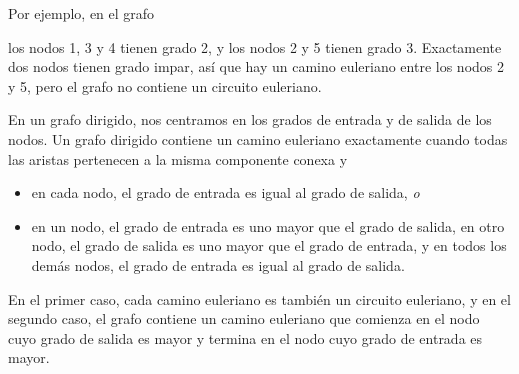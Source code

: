 \begin{samepage}
Por ejemplo, en el grafo
\begin{center}
\end{center}
\end{samepage}
los nodos 1, 3 y 4 tienen grado 2,
y los nodos 2 y 5 tienen grado 3.
Exactamente dos nodos tienen grado impar,
así que hay un camino euleriano entre los nodos 2 y 5,
pero el grafo no contiene un circuito euleriano.

En un grafo dirigido,
nos centramos en los grados de entrada y de salida
de los nodos.
Un grafo dirigido contiene un camino euleriano
exactamente cuando todas las aristas pertenecen a la misma
componente conexa y
\begin{itemize}
\item en cada nodo, el grado de entrada es igual al grado de salida, \emph{o}
\item en un nodo, el grado de entrada es uno mayor que el grado de salida,
en otro nodo, el grado de salida es uno mayor que el grado de entrada,
y en todos los demás nodos, el grado de entrada es igual al grado de salida.
\end{itemize}

En el primer caso, cada camino euleriano
es también un circuito euleriano,
y en el segundo caso, el grafo contiene un camino euleriano
que comienza en el nodo cuyo grado de salida es mayor
y termina en el nodo cuyo grado de entrada es mayor.

